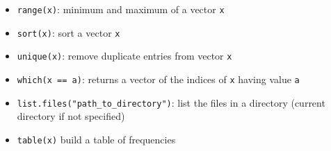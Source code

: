 \documentclass[
  letterpaper,
  DIV=11,
  numbers=noendperiod]{scrreprt}
\providecommand{\tightlist}{%
  \setlength{\itemsep}{0pt}\setlength{\parskip}{0pt}}\usepackage{longtable,booktabs,array}
\begin{document}
\begin{itemize}
\tightlist
\item
  \texttt{range(x)}: minimum and maximum of a vector \texttt{x}
\item
  \texttt{sort(x)}: sort a vector \texttt{x}
\item
  \texttt{unique(x)}: remove duplicate entries from vector \texttt{x}
\item
  \texttt{which(x\ ==\ a)}: returns a vector of the indices of
  \texttt{x} having value \texttt{a}
\item
  \texttt{list.files("path\_to\_directory")}: list the files in a
  directory (current directory if not specified)
\item
  \texttt{table(x)} build a table of frequencies
\end{itemize}
\end{document}
